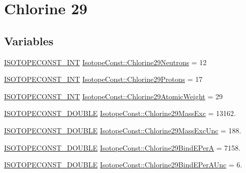 \hypertarget{group___isotope_const-_chlorine-_cl29}{}\section{Chlorine 29}
\label{group___isotope_const-_chlorine-_cl29}
\subsection*{Variables}
\begin{DoxyCompactItemize}
\item 
\mbox{\hyperlink{group___isotope_const-_macros_ga5f18360b3e99483a35c32d789e62621c}{I\+S\+O\+T\+O\+P\+E\+C\+O\+N\+S\+T\+\_\+\+I\+NT}} \mbox{\hyperlink{group___isotope_const-_chlorine-_cl29_ga5ce460aaf621ad57b14cb2d948a94950}{Isotope\+Const\+::\+Chlorine29\+Neutrons}} = 12
\item 
\mbox{\hyperlink{group___isotope_const-_macros_ga5f18360b3e99483a35c32d789e62621c}{I\+S\+O\+T\+O\+P\+E\+C\+O\+N\+S\+T\+\_\+\+I\+NT}} \mbox{\hyperlink{group___isotope_const-_chlorine-_cl29_gabd82682f4992d4d902ebc97614a12ec0}{Isotope\+Const\+::\+Chlorine29\+Protons}} = 17
\item 
\mbox{\hyperlink{group___isotope_const-_macros_ga5f18360b3e99483a35c32d789e62621c}{I\+S\+O\+T\+O\+P\+E\+C\+O\+N\+S\+T\+\_\+\+I\+NT}} \mbox{\hyperlink{group___isotope_const-_chlorine-_cl29_gaa093fe8c1cbcd56105769a971ad6279e}{Isotope\+Const\+::\+Chlorine29\+Atomic\+Weight}} = 29
\item 
\mbox{\hyperlink{group___isotope_const-_macros_ga8f45a7272ce02c0b4c65c44636ed719a}{I\+S\+O\+T\+O\+P\+E\+C\+O\+N\+S\+T\+\_\+\+D\+O\+U\+B\+LE}} \mbox{\hyperlink{group___isotope_const-_chlorine-_cl29_ga1d41cc73518f667d03d696fe07924e0e}{Isotope\+Const\+::\+Chlorine29\+Mass\+Exc}} = 13162.
\item 
\mbox{\hyperlink{group___isotope_const-_macros_ga8f45a7272ce02c0b4c65c44636ed719a}{I\+S\+O\+T\+O\+P\+E\+C\+O\+N\+S\+T\+\_\+\+D\+O\+U\+B\+LE}} \mbox{\hyperlink{group___isotope_const-_chlorine-_cl29_ga9563782187f1101da31e354e7a6f852f}{Isotope\+Const\+::\+Chlorine29\+Mass\+Exc\+Unc}} = 188.
\item 
\mbox{\hyperlink{group___isotope_const-_macros_ga8f45a7272ce02c0b4c65c44636ed719a}{I\+S\+O\+T\+O\+P\+E\+C\+O\+N\+S\+T\+\_\+\+D\+O\+U\+B\+LE}} \mbox{\hyperlink{group___isotope_const-_chlorine-_cl29_gaa6039edf783ad7c16d1c7f807df5f2a2}{Isotope\+Const\+::\+Chlorine29\+Bind\+E\+PerA}} = 7158.
\item 
\mbox{\hyperlink{group___isotope_const-_macros_ga8f45a7272ce02c0b4c65c44636ed719a}{I\+S\+O\+T\+O\+P\+E\+C\+O\+N\+S\+T\+\_\+\+D\+O\+U\+B\+LE}} \mbox{\hyperlink{group___isotope_const-_chlorine-_cl29_ga704276675e717cefdac86e3fd49a442a}{Isotope\+Const\+::\+Chlorine29\+Bind\+E\+Per\+A\+Unc}} = 6.

\end{DoxyCompactItemize}
